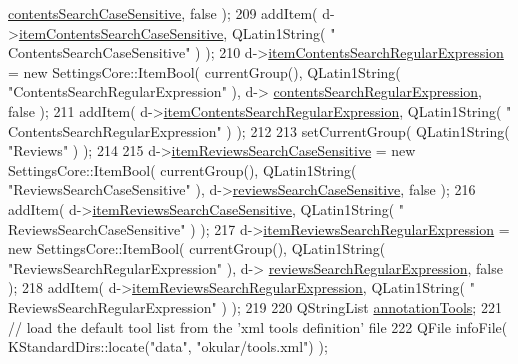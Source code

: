 \begin{DoxyCode}
      \hyperlink{classOkular_1_1SettingsPrivate_ae9050bcbbf06beab63c6a46fe7e9273b}{contentsSearchCaseSensitive}, \textcolor{keyword}{false} );
209   addItem( d->\hyperlink{classOkular_1_1SettingsPrivate_a31bdbcadec0d77d5f5ce1083d8d70232}{itemContentsSearchCaseSensitive}, QLatin1String( \textcolor{stringliteral}{"
      ContentsSearchCaseSensitive"} ) );
210   d->\hyperlink{classOkular_1_1SettingsPrivate_a220f3128585d9da070425c49a650d9e1}{itemContentsSearchRegularExpression} = \textcolor{keyword}{new} SettingsCore::ItemBool( 
      currentGroup(), QLatin1String( \textcolor{stringliteral}{"ContentsSearchRegularExpression"} ), d->
      \hyperlink{classOkular_1_1SettingsPrivate_a40bd9f8a34c27f1fdd6b215fda767d44}{contentsSearchRegularExpression}, \textcolor{keyword}{false} );
211   addItem( d->\hyperlink{classOkular_1_1SettingsPrivate_a220f3128585d9da070425c49a650d9e1}{itemContentsSearchRegularExpression}, QLatin1String( \textcolor{stringliteral}{"
      ContentsSearchRegularExpression"} ) );
212 
213   setCurrentGroup( QLatin1String( \textcolor{stringliteral}{"Reviews"} ) );
214 
215   d->\hyperlink{classOkular_1_1SettingsPrivate_a205618e6d9770cb40fa7073561cf1bff}{itemReviewsSearchCaseSensitive} = \textcolor{keyword}{new} SettingsCore::ItemBool( 
      currentGroup(), QLatin1String( \textcolor{stringliteral}{"ReviewsSearchCaseSensitive"} ), d->\hyperlink{classOkular_1_1SettingsPrivate_af7f4aa7572b8bc8a6a23c9b25785cfe0}{reviewsSearchCaseSensitive},
       \textcolor{keyword}{false} );
216   addItem( d->\hyperlink{classOkular_1_1SettingsPrivate_a205618e6d9770cb40fa7073561cf1bff}{itemReviewsSearchCaseSensitive}, QLatin1String( \textcolor{stringliteral}{"
      ReviewsSearchCaseSensitive"} ) );
217   d->\hyperlink{classOkular_1_1SettingsPrivate_ae5a97eef0f44ac55fbf6366c6b9e0e0e}{itemReviewsSearchRegularExpression} = \textcolor{keyword}{new} SettingsCore::ItemBool( 
      currentGroup(), QLatin1String( \textcolor{stringliteral}{"ReviewsSearchRegularExpression"} ), d->
      \hyperlink{classOkular_1_1SettingsPrivate_a9d9e9251e0bf18a0bdc3ca726c884012}{reviewsSearchRegularExpression}, \textcolor{keyword}{false} );
218   addItem( d->\hyperlink{classOkular_1_1SettingsPrivate_ae5a97eef0f44ac55fbf6366c6b9e0e0e}{itemReviewsSearchRegularExpression}, QLatin1String( \textcolor{stringliteral}{"
      ReviewsSearchRegularExpression"} ) );
219 
220       QStringList \hyperlink{classOkular_1_1Settings_a514e900aa0ed6dcc26aa1daa2521eaa5}{annotationTools};
221       \textcolor{comment}{// load the default tool list from the 'xml tools definition' file}
222       QFile infoFile( KStandardDirs::locate(\textcolor{stringliteral}{"data"}, \textcolor{stringliteral}{"okular/tools.xml"}) );

\end{DoxyCode}
